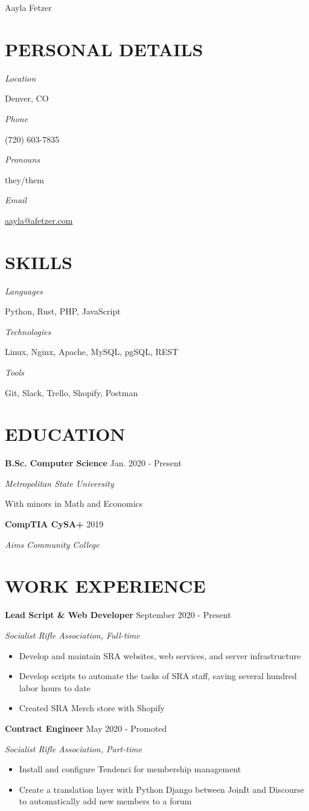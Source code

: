 \documentclass[paper=a4,fontsize=10pt]{scrartcl} %
\newlength{\spacebox}
\newcommand{\sepspace}{\vspace*{1em}}		%
\newcommand{\MyName}[1]{ %
		\Huge \usefont{OT1}{phv}{b}{n} \hfill #1
		\par \normalsize \normalfont}
\newcommand{\NewPart}[1]{\section*{\uppercase{#1}}}
\newcommand{\PersonalEntry}[2]{
		\noindent\hangafter=0 %
		\parbox{\spacebox}{        %
		\textit{#1}}		       %
		\hspace{1.5em} #2 \par}    %
\newcommand{\SkillsEntry}[2]{      %
		\noindent\hangafter=0 %
		\parbox{\spacebox}{        %
		\textit{#1}}			   %
		\hspace{1.5em} #2 \par}    %
\newcommand{\EducationEntry}[4]{
		\noindent \textbf{#1} \hfill      %
		#2 \par
		\textit{#3} \par        %
		\small #4 %
		\normalsize \par}
\newcommand{\WorkEntry}[4]{
		\noindent \textbf{#1} \hfill      %
		#2 \par
		\textit{#3} \par        %
		\small #4 %
		\normalsize \par
}
\begin{document}

\MyName{Aayla Fetzer}

\sepspace

\NewPart{Personal details}{}

\PersonalEntry{Location}{Denver, CO}
\PersonalEntry{Phone}{(720) 603-7835}
\PersonalEntry{Pronouns}{they/them}
\PersonalEntry{Email}{\url{aayla@afetzer.com}}

\NewPart{Skills}{}

\SkillsEntry{Languages}{Python, Rust, PHP, JavaScript}
\SkillsEntry{Technologies}{Linux, Nginx, Apache, MySQL, pgSQL, REST}
\SkillsEntry{Tools}{Git, Slack, Trello, Shopify, Postman}

\NewPart{Education}{}

\EducationEntry{B.Sc. Computer Science}{Jan. 2020 - Present}{Metropolitan State University}{With minors in Math and Economics}
\sepspace
\EducationEntry{CompTIA CySA+}{2019}{Aims Community College}{}

\NewPart{Work experience}{}

\WorkEntry{Lead Script \& Web Developer}{September 2020 - Present}{Socialist Rifle Association, Full-time}{
	\begin{itemize}
		\item Develop and maintain SRA websites, web services, and server infrastructure
		\item Develop scripts to automate the tasks of SRA staff, saving several hundred labor hours to date
		\item Created SRA Merch store with Shopify
	\end{itemize}
}
\sepspace

\WorkEntry{Contract Engineer}{May 2020 - Promoted}{Socialist Rifle Association, Part-time}{
	\begin{itemize}
		\item Install and configure Tendenci for membership management
		\item Create a translation layer with Python Django between JoinIt and Discourse to automatically add new members to a forum 
	\end{itemize}
}
\sepspace
\end{document}
